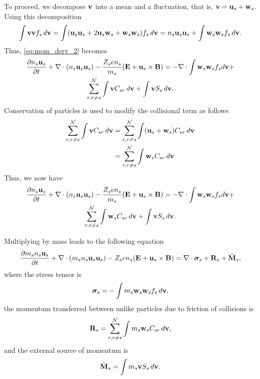 \documentclass[a4paper,11pt]{report}
\begin{document}
To proceed, we decompose $\mathbf{v}$ into a mean and a fluctuation, that is, $\mathbf{v} = \mathbf{u}_s + \mathbf{w}_s$. Using this decomposition 
\begin{equation}
\label{eq:identity_vv}
\int \mathbf{v} \mathbf{v} f_s \, d\mathbf{v} = \int ( \mathbf{u}_s \mathbf{u}_s + 2 \mathbf{u}_s \mathbf{w}_s + \mathbf{w}_s \mathbf{w}_s) f_s \, d\mathbf{v} = n_s \mathbf{u}_s \mathbf{u}_s + \int \mathbf{w}_s \mathbf{w}_s f_s \, d\mathbf{v}.
\end{equation}
Thus, \cref{eq:mom_derv_2} becomes
\begin{multline}
\label{eq:mom_derv_3}
\frac{\partial n_s \mathbf{u}_s}{\partial t} + \nabla \cdot \left ( n_s \mathbf{u}_s \mathbf{u}_s \right) - \frac{Z_s e n_s}{m_s} ( \mathbf{E} + \mathbf{u}_s \times \mathbf{B} ) = -\nabla \cdot \int \mathbf{w}_s \mathbf{w}_s f_s d\mathbf{v} + \\
\sum_{r, r \ne s}^\mathcal{N} \int \mathbf{v} C_{s r} \, d\mathbf{v} + \int \mathbf{v} S_s \, d\mathbf{v}.
\end{multline}
Conservation of particles is used to modify the collisional term as follows
\begin{align}
    \label{eq:mom_collision_expansion}
    \sum_{r,r \ne s}^\mathcal{N} \int \mathbf{v} C_{s r} \, d\mathbf{v} 
    &= \sum_{r,r \ne s}^\mathcal{N} \int (\mathbf{u}_s + \mathbf{w}_s) C_{s r} \, d\mathbf{v} \nonumber \\
    &= \sum_{r,r \ne s}^\mathcal{N} \int \mathbf{w}_s C_{s r} \, d\mathbf{v} 
\end{align}
Thus, we now have
\begin{multline}
\label{eq:mom_derv_4}
\frac{\partial n_s \mathbf{u}_s}{\partial t} + \nabla \cdot \left ( n_s \mathbf{u}_s \mathbf{u}_s \right) - \frac{Z_s e n_s}{m_s} ( \mathbf{E} + \mathbf{u}_s \times \mathbf{B} ) = -\nabla \cdot \int \mathbf{w}_s \mathbf{w}_s f_s d\mathbf{v} + \\
\sum_{r, r \ne s}^\mathcal{N} \int \mathbf{w}_s C_{s r} \, d\mathbf{v} + \int \mathbf{v} S_s \, d\mathbf{v}.
\end{multline}

Multiplying by mass leads to the following equation
\begin{equation}
\label{eq:mom_derv_5}
\frac{\partial m_s n_s \mathbf{u}_s}{\partial t} + \nabla \cdot \left ( m_s n_s \mathbf{u}_s \mathbf{u}_s \right) - Z_s e n_s ( \mathbf{E} + \mathbf{u}_s \times \mathbf{B} ) = \nabla \cdot \boldsymbol{\sigma}_s + \mathbf{R}_s + \hat{\mathbf{M}}_s,
\end{equation}
where the stress tensor is
\begin{equation}
\boldsymbol{\sigma}_s = -\int m_s \mathbf{w}_s \mathbf{w}_s f_s \, d\mathbf{v},
\end{equation}
the momentum transferred between unlike particles due to friction of collisions is
\begin{equation}
\mathbf{R}_s = \sum_{r, r \ne s}^\mathcal{N} \int m_s \mathbf{w}_s C_{s r} \, d\mathbf{v},
\end{equation}
and the external source of momentum is
\begin{equation}
\hat{\mathbf{M}}_s = \int m_s \mathbf{v} S_s \, d\mathbf{v}.
\end{equation}
 
\end{document}

